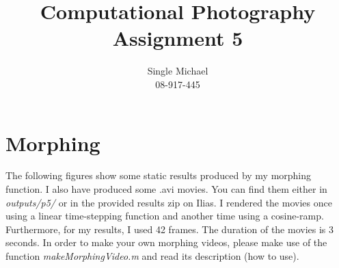 \documentclass{paper}
\title{Computational Photography Assignment 5}
\author{Single Michael\\08-917-445}
\begin{document}
\maketitle


\section{Morphing}
The following figures show some static results produced by my morphing function. I also have produced some .avi movies. You can find them either in \emph{outputs/p5/} or in the provided results zip on Ilias. I rendered the movies once using a linear time-stepping function and another time using a cosine-ramp. Furthermore, for my results, I used 42 frames. The duration of the movies is 3 seconds. In order to make your own morphing videos, please make use of the function \emph{makeMorphingVideo.m} and read its description (how to use).
\end{document}
